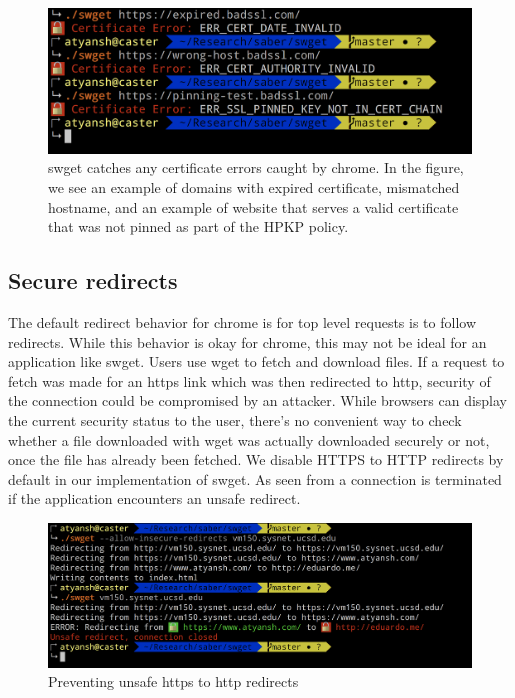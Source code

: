 \begin{figure}[h]
  \includegraphics[width=\textwidth]{figures/cert-error}
  \caption[Behavior on certificate errors]{swget catches any certificate errors
  caught by chrome. In the figure, we see an example of domains with expired
  certificate, mismatched hostname, and an example of website that serves a
  valid certificate that was not pinned as part of the HPKP policy.} 
  \label{fig:cert-error-saber}
\end{figure}


\subsection{Secure redirects}
The default redirect behavior for chrome is for top level requests is to follow
redirects. While this behavior is okay for chrome, this may not be ideal for an
application like swget. Users use wget to fetch and download files. If a
request to fetch was made for an https link which was then redirected to http,
security of the connection could be compromised by an attacker. While browsers
can display the current security status to the user, there's no convenient way
to check whether a file downloaded with wget was actually downloaded securely
or not, once the file has already been fetched. We disable HTTPS to HTTP
redirects by default in our implementation of swget. As seen from
 a connection is terminated if the application
encounters an unsafe redirect.

\begin{figure}[h]
  \includegraphics[width=\textwidth]{figures/redirect}
  \caption{Preventing unsafe https to http redirects} 
  \label{fig:redirect-saber}
\end{figure}

